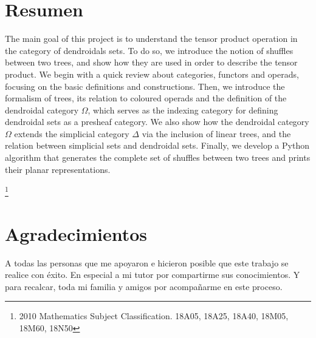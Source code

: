 \documentclass[11pt,a4paper,openright,oneside]{article}
\numberwithin{equation}{section}
\theoremstyle{definition}
\begin{document}


\section*{Resumen}
The main goal of this project is to understand the tensor product operation in the category of dendroidals sets.
To do so, we introduce the notion of shuffles between two trees, and show how they are used in order to describe the tensor product.
We begin with a quick review about categories, functors and operads, focusing on the basic definitions and constructions.
Then, we introduce the formalism of trees, its relation to coloured operads and the definition of the dendroidal category $\Omega$, which serves as the indexing category for defining dendroidal sets as a presheaf category.
We also show how the dendroidal category $\Omega$ extends the simplicial category $\Delta$ via the inclusion of linear trees, and the relation between simplicial sets and dendroidal sets.
Finally, we develop a Python algorithm that generates the complete set of shuffles between two trees and prints their planar representations.

 {\let\thefootnote\relax\footnote{2010 Mathematics Subject Classification. 18A05, 18A25, 18A40, 18M05, 18M60, 18N50}}
\newpage


\section*{Agradecimientos}
A todas las personas que me apoyaron e hicieron posible que este trabajo se realice con \'exito.
En especial a mi tutor por compartirme sus conocimientos.
Y para recalcar, toda mi familia y amigos por acompa\~narme en este proceso.

\newpage


\tableofcontents
\newpage
\end{document}

